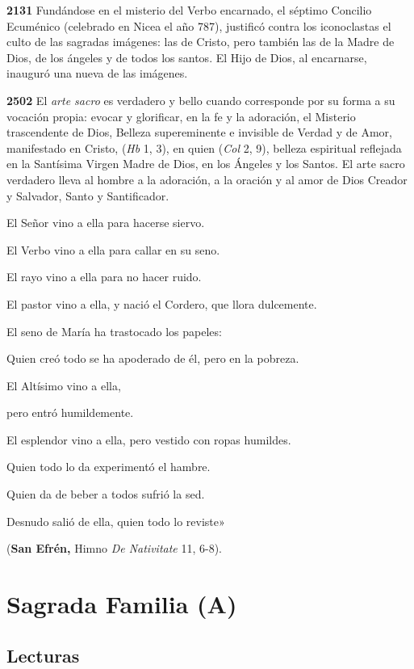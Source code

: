 \begin{body}
\begin{body}
\textbf{2131} Fundándose en el misterio del Verbo encarnado, el séptimo Concilio Ecuménico (celebrado en Nicea el año 787), justificó contra los iconoclastas el culto de las sagradas imágenes: las de Cristo, pero también las de la Madre de Dios, de los ángeles y de todos los santos. El Hijo de Dios, al encarnarse, inauguró una nueva  de las imágenes.

\textbf{2502} El \emph{arte sacro} es verdadero y bello cuando corresponde por su forma a su vocación propia: evocar y glorificar, en la fe y la adoración, el Misterio trascendente de Dios, Belleza supereminente e invisible de Verdad y de Amor, manifestado en Cristo,  (\emph{Hb} 1, 3), en quien  (\emph{Col} 2, 9), belleza espiritual reflejada en la Santísima Virgen Madre de Dios, en los Ángeles y los Santos. El arte sacro verdadero lleva al hombre a la adoración, a la oración y al amor de Dios Creador y Salvador, Santo y Santificador.

El Señor vino a ella para hacerse siervo.

El Verbo vino a ella para callar en su seno.

El rayo vino a ella para no hacer ruido.

El pastor vino a ella, y nació el Cordero, que llora dulcemente.

El seno de María ha trastocado los papeles:

Quien creó todo se ha apoderado de él, pero en la pobreza.

El Altísimo vino a ella,

pero entró humildemente.

El esplendor vino a ella, pero vestido con ropas humildes.

Quien todo lo da experimentó el hambre.

Quien da de beber a todos sufrió la sed.

Desnudo salió de ella, quien todo lo reviste»

(\textbf{San Efrén,} Himno \emph{De Nativitate} 11, 6-8).

\chapter{Sagrada Familia (A)}

\section{Lecturas}


\end{body}
\end{body}
